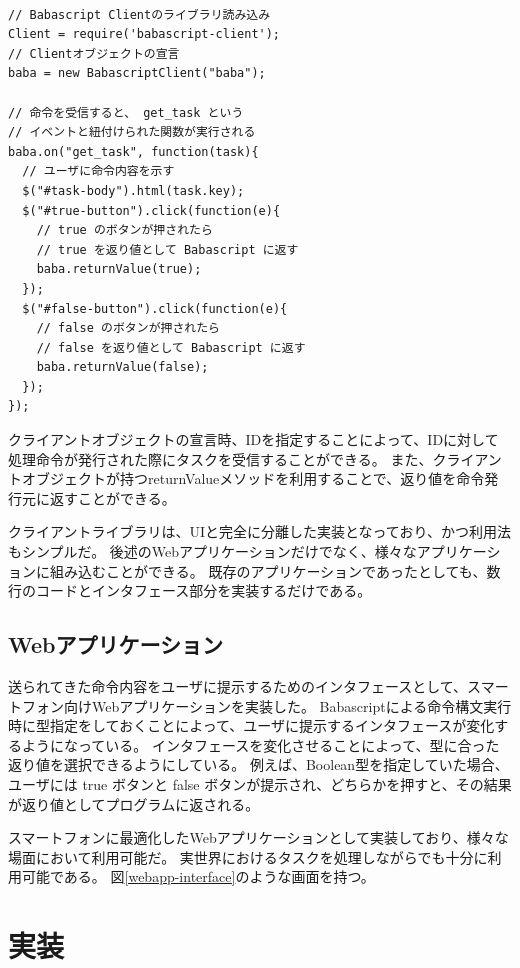 \documentclass[twoside]{wiss}
\begin{document}
\begin{lstlisting}[caption=BabascriptClientのライブラリコード, label=client_library]

// Babascript Clientのライブラリ読み込み
Client = require('babascript-client');
// Clientオブジェクトの宣言
baba = new BabascriptClient("baba");

// 命令を受信すると、 get_task という
// イベントと紐付けられた関数が実行される
baba.on("get_task", function(task){
  // ユーザに命令内容を示す
  $("#task-body").html(task.key);
  $("#true-button").click(function(e){
    // true のボタンが押されたら
    // true を返り値として Babascript に返す
    baba.returnValue(true);
  });
  $("#false-button").click(function(e){
    // false のボタンが押されたら
    // false を返り値として Babascript に返す
    baba.returnValue(false);
  });
});

\end{lstlisting}

クライアントオブジェクトの宣言時、IDを指定することによって、IDに対して処理命令が発行された際にタスクを受信することができる。
また、クライアントオブジェクトが持つreturnValueメソッドを利用することで、返り値を命令発行元に返すことができる。

クライアントライブラリは、UIと完全に分離した実装となっており、かつ利用法もシンプルだ。
後述のWebアプリケーションだけでなく、様々なアプリケーションに組み込むことができる。
既存のアプリケーションであったとしても、数行のコードとインタフェース部分を実装するだけである。

\subsection{Webアプリケーション}

送られてきた命令内容をユーザに提示するためのインタフェースとして、スマートフォン向けWebアプリケーションを実装した。
Babascriptによる命令構文実行時に型指定をしておくことによって、ユーザに提示するインタフェースが変化するようになっている。
インタフェースを変化させることによって、型に合った返り値を選択できるようにしている。
例えば、Boolean型を指定していた場合、ユーザには true ボタンと false ボタンが提示され、どちらかを押すと、その結果が返り値としてプログラムに返される。

スマートフォンに最適化したWebアプリケーションとして実装しており、様々な場面において利用可能だ。
実世界におけるタスクを処理しながらでも十分に利用可能である。
図\ref{webapp-interface}のような画面を持つ。

\section{実装}
\end{document}
